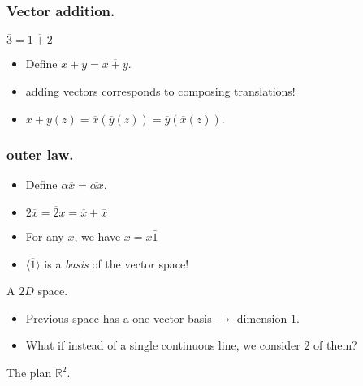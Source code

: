 \documentclass{beamer}
\begin{document}
\begin{frame}
  \frametitle{Vector addition.}
  \begin{exampleblock}{$\overline{3} = \overline{1 + 2}$}
    \begin{center}
      
    \end{center}
    
    \begin{itemize}
    \item Define $\overline x + \overline y = \overline{x + y}$.
    \item \alert{adding vectors corresponds to composing translations!}
    \item $\overline{x + y}(z) = \overline{x}(\overline{y}(z)) = \overline{y}(\overline{x}(z))$.
    \end{itemize}
  \end{exampleblock}
\end{frame}

\begin{frame}
  \frametitle{outer law.}
    \begin{center}
      
    \end{center}
    
    \begin{itemize}
    \item Define $\alpha\overline x = \overline{\alpha x }$.
    \item $2\overline{x} = \overline 2x = \overline{x} + \overline{x}$
    \item For any $x$, we have $\bar x = x \bar 1$
    \item \alert{$\langle \overline 1 \rangle$ is a \emph{basis} of the vector space!}
    \end{itemize}
\end{frame}

\begin{frame}{A $2D$ space.}
  \begin{itemize}
  \item Previous space has a one vector basis $\rightarrow$ dimension $1$.
  \item What if instead of a single continuous line, we consider $2$ of them?
  \end{itemize}

  \begin{exampleblock}{The plan $\mathbb{R}^2$.}
    \begin{center}
      
    \end{center}
  \end{exampleblock}
\end{frame}
\end{document}
